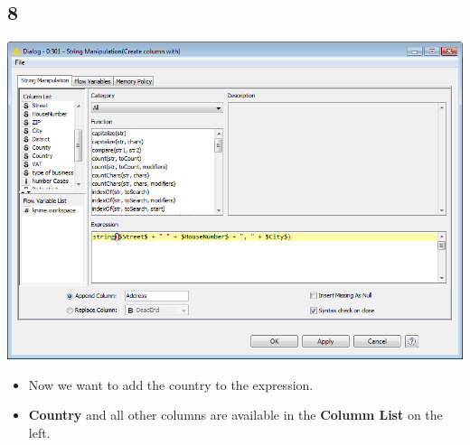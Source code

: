 \documentclass{beamer}
\begin{document}
\subsection{8}
\begin{frame}
	\begin{center}
  		\includegraphics[height=0.6\textheight]{8.png}
	\end{center}
	\begin{itemize}
		\item Now we want to add the country to the expression.
		\item \textbf{Country} and all other columns are available in the \textbf{Columm List} on the left.
	\end{itemize}
\end{frame}
\end{document}
